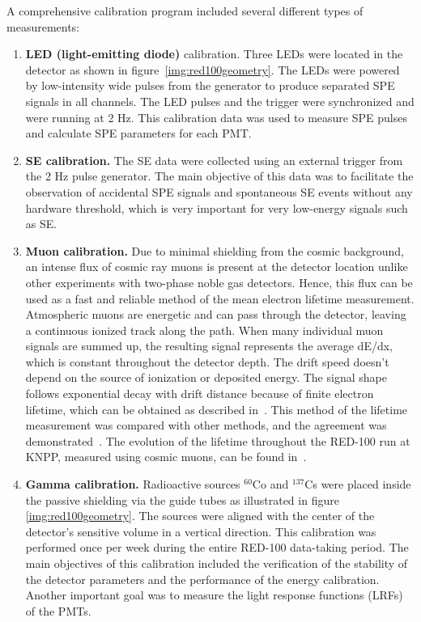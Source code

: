 \documentclass[a4paper,11pt]{article}
\begin{document}
A comprehensive calibration program included several different types of measurements:
%
\begin{enumerate}
    \item \textbf{LED (light-emitting diode)} calibration. Three LEDs were located in the detector as shown in figure~\ref{img:red100geometry}. The LEDs were powered by low-intensity wide pulses from the generator to produce separated SPE signals in all channels. The LED pulses and the trigger were synchronized and were running at 2 Hz. This calibration data was used to measure SPE pulses and calculate SPE parameters for each PMT.

    \item \textbf{SE calibration.} The SE data were collected using an external trigger from the 2 Hz pulse generator. The main objective of this data was to facilitate the observation of accidental SPE signals and spontaneous SE events without any hardware threshold, which is very important for very low-energy signals such as SE. 
    
    \item \textbf{Muon calibration.} Due to minimal shielding from the cosmic background, an intense flux of cosmic ray muons is present at the detector location unlike other experiments with two-phase noble gas detectors. Hence, this flux can be used as a fast and reliable method of the mean electron lifetime measurement. Atmospheric muons are energetic and can pass through the detector, leaving a continuous ionized track along the path. When many individual muon signals are summed up, the resulting signal represents the average dE/dx, which is constant throughout the detector depth. The drift speed doesn't depend on the source of ionization or deposited energy. The signal shape follows exponential decay with drift distance because of finite electron lifetime, which can be obtained as described in~\cite{lifetime}. This method of the lifetime measurement was compared with other methods, and the agreement was demonstrated~\cite{7027252}. The evolution of the lifetime throughout the RED-100 run at KNPP, measured using cosmic muons, can be found in~\cite{The_RED100_Experiment}. 

    \item \textbf{Gamma calibration.} Radioactive sources $^{60}$Co and $^{137}$Cs were placed inside the passive shielding via the guide tubes as illustrated in figure \ref{img:red100geometry}. The sources were aligned with the center of the detector's sensitive volume in a vertical direction. This calibration was performed once per week during the entire RED-100 data-taking period. The main objectives of this calibration included the verification of the stability of the detector parameters and the performance of the energy calibration. Another important goal was to measure the light response functions (LRFs) of the PMTs.

\end{enumerate}
\end{document}

